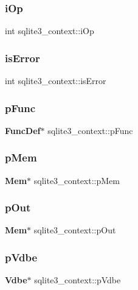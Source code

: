 \subsubsection{iOp}
{\footnotesize\ttfamily int sqlite3\+\_\+context\+::i\+Op}

\mbox{\label{structsqlite3__context_ae4351b8da8c6d2676074612c1b8d4af5}} 
\subsubsection{isError}
{\footnotesize\ttfamily int sqlite3\+\_\+context\+::is\+Error}

\mbox{\label{structsqlite3__context_af4215c87be2c0cb10868f623a552a2aa}} 
\subsubsection{pFunc}
{\footnotesize\ttfamily \textbf{ Func\+Def}$\ast$ sqlite3\+\_\+context\+::p\+Func}

\mbox{\label{structsqlite3__context_a7b84aa5920329cb0eb943832175b48b5}} 
\subsubsection{pMem}
{\footnotesize\ttfamily \textbf{ Mem}$\ast$ sqlite3\+\_\+context\+::p\+Mem}

\mbox{\label{structsqlite3__context_ae22b1db2ea357b70dda4a86b6df01f34}} 
\subsubsection{pOut}
{\footnotesize\ttfamily \textbf{ Mem}$\ast$ sqlite3\+\_\+context\+::p\+Out}

\mbox{\label{structsqlite3__context_ab35b02abe9a81e0c8cbdaeb0aa1a5874}} 
\subsubsection{pVdbe}
{\footnotesize\ttfamily \textbf{ Vdbe}$\ast$ sqlite3\+\_\+context\+::p\+Vdbe}

